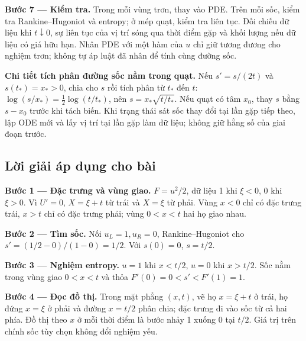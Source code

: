 \documentclass[10pt,a4paper]{article}
\begin{document}
\textbf{Bước 7 — Kiểm tra.} Trong mỗi vùng trơn, thay vào PDE. Trên mỗi sốc, kiểm tra Rankine–Hugoniot và entropy; ở mép quạt, kiểm tra liên tục. Đối chiếu dữ liệu khi $t\downarrow0$, sự liên tục của vị trí sóng qua thời điểm gặp và khối lượng nếu dữ liệu có giá hữu hạn. Nhân PDE với một hàm của $u$ chỉ giữ tương đương cho nghiệm trơn; không tự áp luật đã nhân để tính cùng đường sốc.

\textbf{Chi tiết tích phân đường sốc nằm trong quạt.} Nếu $s'=s/(2t)$ và $s(t_*)=x_*>0$, chia cho $s$ rồi tích phân từ $t_*$ đến $t$: $\log(s/x_*)=\frac12\log(t/t_*)$, nên $s=x_*\sqrt{t/t_*}$. Nếu quạt có tâm $x_0$, thay $s$ bằng $s-x_0$ trước khi tách biến. Khi trạng thái sát sốc thay đổi tại lần gặp tiếp theo, lập ODE mới và lấy vị trí tại lần gặp làm dữ liệu; không giữ hằng số của giai đoạn trước.
\subsection*{Lời giải áp dụng cho bài}
\textbf{Bước 1 — Đặc trưng và vùng giao.} $F=u^2/2$, dữ liệu 1 khi $\xi<0$, 0 khi $\xi>0$. Vì $U'=0$, $X=\xi+t$ từ trái và $X=\xi$ từ phải. Vùng $x<0$ chỉ có đặc trưng trái, $x>t$ chỉ có đặc trưng phải; vùng $0<x<t$ hai họ giao nhau.

\textbf{Bước 2 — Tìm sốc.} Nối $u_L=1,u_R=0$, Rankine–Hugoniot cho $s'=(1/2-0)/(1-0)=1/2$. Với $s(0)=0$, $s=t/2$.

\textbf{Bước 3 — Nghiệm entropy.} $u=1$ khi $x<t/2$, $u=0$ khi $x>t/2$. Sốc nằm trong vùng giao $0<x<t$ và thỏa $F'(0)=0<s'<F'(1)=1$.

\textbf{Bước 4 — Đọc đồ thị.} Trong mặt phẳng $(x,t)$, vẽ họ $x=\xi+t$ ở trái, họ đứng $x=\xi$ ở phải và đường $x=t/2$ phân chia; đặc trưng đi vào sốc từ cả hai phía. Đồ thị theo $x$ ở mỗi thời điểm là bước nhảy 1 xuống 0 tại $t/2$. Giá trị trên chính sốc tùy chọn không đổi nghiệm yếu.
\end{document}
